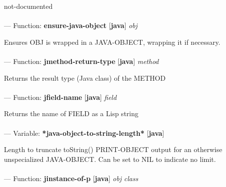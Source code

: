 \begin{adjustwidth}{5em}{5em}
not-documented
\end{adjustwidth}

\paragraph{}
\label{JAVA:ENSURE-JAVA-OBJECT}
--- Function: \textbf{ensure-java-object} [\textbf{java}] \textit{obj}

\begin{adjustwidth}{5em}{5em}
Ensures OBJ is wrapped in a JAVA-OBJECT, wrapping it if necessary.
\end{adjustwidth}

\paragraph{}
\label{JAVA:JMETHOD-RETURN-TYPE}
--- Function: \textbf{jmethod-return-type} [\textbf{java}] \textit{method}

\begin{adjustwidth}{5em}{5em}
Returns the result type (Java class) of the METHOD
\end{adjustwidth}

\paragraph{}
\label{JAVA:JFIELD-NAME}
--- Function: \textbf{jfield-name} [\textbf{java}] \textit{field}

\begin{adjustwidth}{5em}{5em}
Returns the name of FIELD as a Lisp string
\end{adjustwidth}

\paragraph{}
\label{JAVA:*JAVA-OBJECT-TO-STRING-LENGTH*}
--- Variable: \textbf{*java-object-to-string-length*} [\textbf{java}] \textit{}

\begin{adjustwidth}{5em}{5em}
Length to truncate toString() PRINT-OBJECT output for an otherwise unspecialized JAVA-OBJECT.  Can be set to NIL to indicate no limit.
\end{adjustwidth}

\paragraph{}
\label{JAVA:JINSTANCE-OF-P}
--- Function: \textbf{jinstance-of-p} [\textbf{java}] \textit{obj class}

